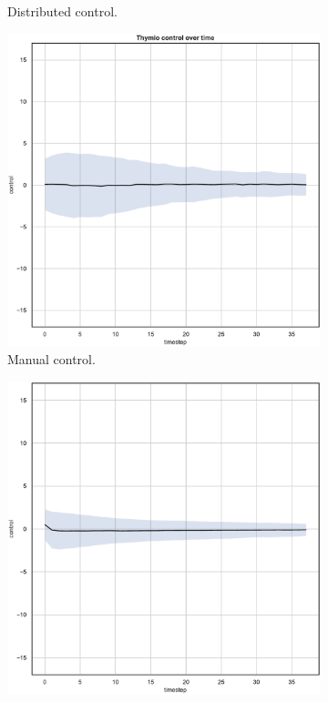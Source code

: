 \begin{figure}[H]
\begin{center}
\begin{subfigure}[h]{0.35\textwidth}
			\caption{Distributed control.}
		\end{subfigure}
	\end{center}
	\begin{center}
		\begin{subfigure}[h]{0.35\textwidth}			
			\includegraphics[width=\textwidth]{contents/images/net-d15/control-overtime-manual}%
			\caption{Manual control.}
		\end{subfigure}
		\hspace{1cm}
		\begin{subfigure}[h]{0.35\textwidth}
			\includegraphics[width=\textwidth]{contents/images/net-c15/control-overtime-learned_communication}

\end{subfigure}
\end{center}
\end{figure}
